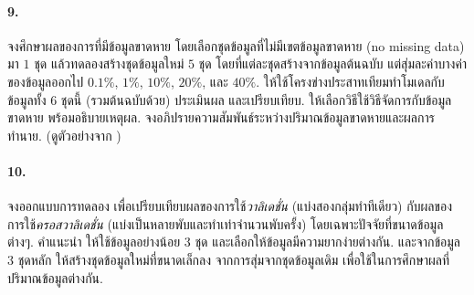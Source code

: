 \paragraph{9.}
จงศึกษาผลของการที่มีข้อมูลขาดหาย โดยเลือกชุดข้อมูลที่ไม่มีเขตข้อมูลขาดหาย (no missing data) มา $1$ ชุด แล้วทดลองสร้างชุดข้อมูลใหม่ $5$ ชุด  โดยที่แต่ละชุดสร้างจากข้อมูลต้นฉบับ แต่สุ่มละค่าบางค่าของข้อมูลออกไป $0.1\%$, $1\%$, $10\%$, $20\%$, และ $40\%$.
ให้ใช้โครงข่างประสาทเทียมทำโมเดลกับข้อมูลทั้ง $6$ ชุดนี้ (รวมต้นฉบับด้วย) ประเมินผล และเปรียบเทียบ.
ให้เลือกวิธีใช้วิธีจัดการกับข้อมูลขาดหาย พร้อมอธิบายเหตุผล.
จงอภิปรายความสัมพันธ์ระหว่างปริมาณข้อมูลขาดหายและผลการทำนาย.
(ดูตัวอย่างจาก \cite{JuholaLaurikkala2013a})

\paragraph{10.}
จงออกแบบการทดลอง เพื่อเปรียบเทียบผลของการใช้\textit{วาลิเดชั่น} (แบ่งสองกลุ่มทำทีเดียว) 
กับผลของการใช้\textit{ครอสวาลิเดชั่น} (แบ่งเป็นหลายพับและทำเท่าจำนวนพับครั้ง) โดยเฉพาะปัจจัยที่ขนาดข้อมูลต่างๆ.
คำแนะนำ ให้ใช้ข้อมูลอย่างน้อย $3$ ชุด และเลือกให้ข้อมูลมีความยากง่ายต่างกัน.
และจากข้อมูล $3$ ชุดหลัก ให้สร้างชุดข้อมูลใหม่ที่ขนาดเล็กลง จากการสุ่มจากชุดข้อมูลเดิม เพื่อใช้ในการศึกษาผลที่ปริมาณข้อมูลต่างกัน.

